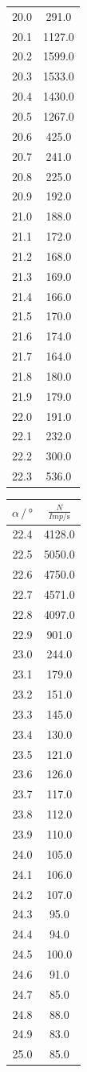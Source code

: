 \begin{table}
\begin{tabular}[t]{cc}
  20.0 & 291.0\\
  20.1 & 1127.0\\
  20.2 & 1599.0\\
  20.3 & 1533.0\\
  20.4 & 1430.0\\
  20.5 & 1267.0\\
  20.6 & 425.0\\
  20.7 & 241.0\\
  20.8 & 225.0\\
  20.9 & 192.0\\
  21.0 & 188.0\\
  21.1 & 172.0\\
  21.2 & 168.0\\
  21.3 & 169.0\\
  21.4 & 166.0\\
  21.5 & 170.0\\
  21.6 & 174.0\\
  21.7 & 164.0\\
  21.8 & 180.0\\
  21.9 & 179.0\\
  22.0 & 191.0\\
  22.1 & 232.0\\
  22.2 & 300.0\\
  22.3 & 536.0\\
  \bottomrule
  \end{tabular}
  \begin{tabular}[t]{cc}
  \toprule
  $\alpha \,/\, \si{\degree} $ & $\frac{N}{Imp/\si{\second}}$ \\
  \midrule
  22.4 & 4128.0\\
  22.5 & 5050.0\\
  22.6 & 4750.0\\
  22.7 & 4571.0\\
  22.8 & 4097.0\\
  22.9 & 901.0\\
  23.0 & 244.0\\
  23.1 & 179.0\\
  23.2 & 151.0\\
  23.3 & 145.0\\
  23.4 & 130.0\\
  23.5 & 121.0\\
  23.6 & 126.0\\
  23.7 & 117.0\\
  23.8 & 112.0\\
  23.9 & 110.0\\
  24.0 & 105.0\\
  24.1 & 106.0\\
  24.2 & 107.0\\
  24.3 & 95.0\\
  24.4 & 94.0\\
  24.5 & 100.0\\
  24.6 & 91.0\\
  24.7 & 85.0\\
  24.8 & 88.0\\
  24.9 & 83.0\\
  25.0 & 85.0\\
  \bottomrule
  \end{tabular}
  \label{tab:emmision2}
\end{table}
\FloatBarrier
